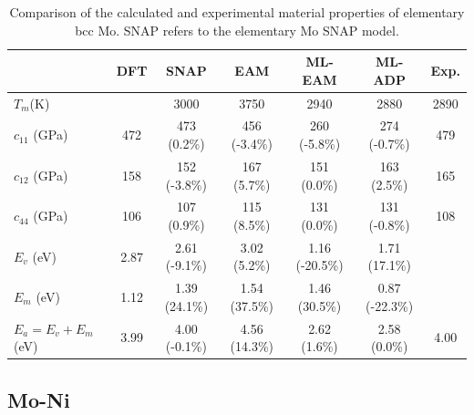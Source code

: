\documentclass[prb,reprint]{revtex4-2}
\begin{document}
% 
%
\begin{table}[htp]
\centering
\begin{tabular}{lcccccc}
\hline
    & DFT & SNAP & EAM & ML-EAM & ML-ADP & Exp. \\
\hline
$T_{m}$(K) & & 3000 & 3750 & 2940 & 2880 & 2890 \\
$c_{11}$ (GPa) & 472 & 473 (0.2\%) & 456 (-3.4\%) & 260 (-5.8\%) & 274 (-0.7\%) & 479 \\
$c_{12}$ (GPa) & 158 & 152 (-3.8\%) & 167 (5.7\%) & 151 (0.0\%) & 163 (2.5\%) & 165 \\
$c_{44}$ (GPa) & 106 & 107 (0.9\%) & 115 (8.5\%) & 131 (0.0\%) & 131 (-0.8\%) & 108 \\
$E_{v}$ (eV) & 2.87 & 2.61 (-9.1\%) & 3.02 (5.2\%) & 1.16 (-20.5\%) & 1.71 (17.1\%) & \\
$E_{m}$ (eV) & 1.12 & 1.39 (24.1\%) & 1.54 (37.5\%) & 1.46 (30.5\%) & 0.87 (-22.3\%) & \\
$E_{a} = E_{v} + E_{m} $ (eV) & 3.99 & 4.00 (-0.1\%) & 4.56 (14.3\%) & 2.62 (1.6\%) & 2.58 (0.0\%) & 4.00 \\
\hline
\end{tabular}
\caption{\label{table:elementary_Mo} Comparison of the calculated and 
experimental material properties of elementary bcc Mo. SNAP refers to the 
elementary Mo SNAP model.
}
\end{table}

% 
%
\subsection{Mo-Ni}
\label{sec:alloy}


\end{document}
